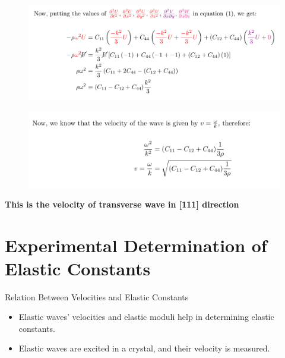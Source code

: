 \documentclass[aspectratio=43]{beamer}
\begin{document}
 \begin{frame}
       \begin{figure}
        \centering
        \includegraphics[width=\linewidth]{images/12.png}
    \end{figure}
\end{frame}

 \begin{frame}
       \begin{figure}
        \centering
        \includegraphics[width=\linewidth]{images/13.png}
    \end{figure}
    \textbf{This is the velocity of transverse wave in [111] direction}
\end{frame}

\section{Experimental Determination of Elastic Constants}

\begin{frame}{Relation Between Velocities and Elastic Constants}
    \begin{itemize}
        \item Elastic waves' velocities and elastic moduli help in determining elastic constants.
        \item Elastic waves are excited in a crystal, and their velocity is measured.
    \end{itemize}
\end{frame}
\end{document}
